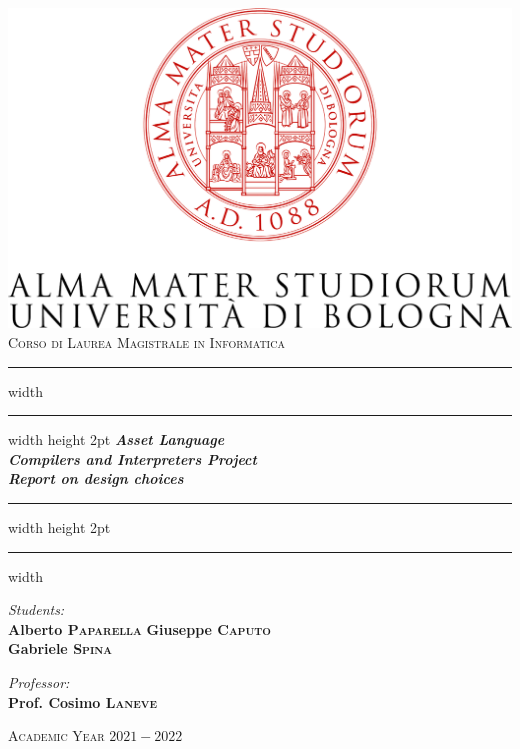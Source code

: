 \documentclass[11pt]{article} %
\begin{document}

\begin{titlepage}
	\centering
	\includegraphics[width=\textwidth]{logo.png}\\
	\vspace*{1cm}
	\Large \textsc{Corso di Laurea Magistrale in Informatica}
	
	\vspace*{10mm}
	\hrule width \hsize \kern 1mm \hrule width \hsize height 2pt
	\vspace*{5mm}
	\Huge \emph{\textbf{Asset Language}}\\
	\large \emph{\textbf{Compilers and Interpreters Project}}\\
	\large \emph{\textbf{Report on design choices}}
	\vspace*{5mm}
	\hrule width \hsize height 2pt
	\vspace*{1mm}
	\hrule width \hsize \kern 1mm
	
	\vspace*{10mm}
	\begin{minipage}{0.45\textwidth}
		\begin{flushleft} \Large
			\emph{Students:}\\
			\Large \textbf{Alberto \textsc{Paparella}}
			\Large \textbf{Giuseppe \textsc{Caputo}}\\
			\Large \textbf{Gabriele \textsc{Spina}}
		\end{flushleft}
	\end{minipage}	
	\begin{minipage}{0.45\textwidth}
		\begin{flushright} \Large
			\emph{Professor:}\\
			\Large \textbf{Prof. Cosimo \textsc{Laneve}}
		\end{flushright}
	\end{minipage}
	
	\vspace*{15mm}
	\Large \textsc{Academic Year $2021-2022$}
\end{titlepage}
\end{document}
